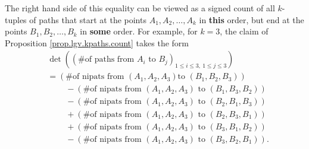 \begin{definition}
The right hand side of this equality can be viewed as a signed count of all
$k$-tuples of paths that start at the points $A_{1},A_{2},\ldots,A_{k}$ in
\textbf{this} order, but end at the points $B_{1},B_{2},\ldots,B_{k}$ in
\textbf{some} order. For example, for $k=3$, the claim of Proposition
\ref{prop.lgv.kpaths.count} takes the form%
\begin{align*}
&  \det\left(  \left(  \text{\# of paths from }A_{i}\text{ to }B_{j}\right)
_{1\leq i\leq3,\ 1\leq j\leq3}\right) \\
&  =\left(  \text{\# of nipats from }\left(  A_{1},A_{2},A_{3}\right)  \text{
to }\left(  B_{1},B_{2},B_{3}\right)  \right) \\
&  \ \ \ \ \ \ \ \ \ \ -\left(  \text{\# of nipats from }\left(  A_{1}%
,A_{2},A_{3}\right)  \text{ to }\left(  B_{1},B_{3},B_{2}\right)  \right) \\
&  \ \ \ \ \ \ \ \ \ \ -\left(  \text{\# of nipats from }\left(  A_{1}%
,A_{2},A_{3}\right)  \text{ to }\left(  B_{2},B_{1},B_{3}\right)  \right) \\
&  \ \ \ \ \ \ \ \ \ \ +\left(  \text{\# of nipats from }\left(  A_{1}%
,A_{2},A_{3}\right)  \text{ to }\left(  B_{2},B_{3},B_{1}\right)  \right) \\
&  \ \ \ \ \ \ \ \ \ \ +\left(  \text{\# of nipats from }\left(  A_{1}%
,A_{2},A_{3}\right)  \text{ to }\left(  B_{3},B_{1},B_{2}\right)  \right) \\
&  \ \ \ \ \ \ \ \ \ \ -\left(  \text{\# of nipats from }\left(  A_{1}%
,A_{2},A_{3}\right)  \text{ to }\left(  B_{3},B_{2},B_{1}\right)  \right)  .
\end{align*}



\end{definition}
